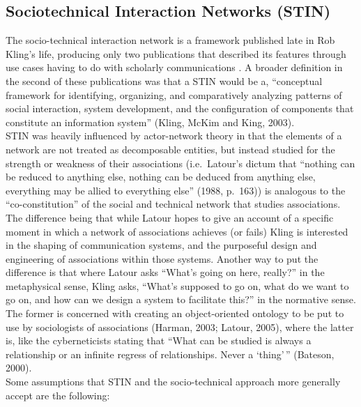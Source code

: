 \subsection*{Sociotechnical Interaction Networks (STIN)} 

The socio-technical interaction network is a framework published late in Rob Kling's life, producing only two publications that described its features through use cases having to do with scholarly communications \citep{kling2000scientific, kling2003bit}. A broader definition in the second of these publications was that a STIN would be a, ``conceptual framework for identifying,
organizing, and comparatively analyzing patterns of social interaction,
system development, and the configuration of components that constitute
an information system'' (Kling, McKim and King, 2003).\\

STIN was heavily influenced by actor-network
theory in that the elements of a network are not treated as decomposable
entities, but instead studied for the strength or weakness of their
associations (i.e.~Latour's dictum that ``nothing can be reduced to
anything else, nothing can be deduced from anything else, everything may
be allied to everything else'' (1988, p.~163)) is analogous to the
``co-constitution'' of the social and technical network that studies
associations. The difference being that while Latour hopes to give an
account of a specific moment in which a network of associations achieves
(or fails) Kling is interested in the shaping of communication systems,
and the purposeful design and engineering of associations within those
systems. Another way to put the difference is that where Latour asks
``What's going on here, really?'' in the metaphysical sense, Kling asks,
``What's supposed to go on, what do we want to go on, and how can we
design a system to facilitate this?'' in the normative sense. The former
is concerned with creating an object-oriented ontology to be put to use
by sociologists of associations (Harman, 2003; Latour, 2005), where the
latter is, like the cyberneticists stating that ``What can be studied is
always a relationship or an infinite regress of relationships. Never a
`thing'\,'' (Bateson, 2000).\\

Some assumptions that STIN and the socio-technical approach more
generally accept are the following:

